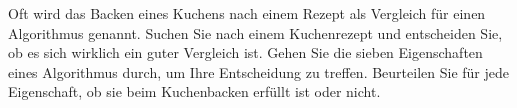 \begin{exercise}
Oft wird das Backen eines Kuchens nach einem Rezept als Vergleich für einen Algorithmus genannt. Suchen Sie nach einem Kuchenrezept und entscheiden Sie, ob es sich wirklich ein guter Vergleich ist. Gehen Sie die sieben Eigenschaften eines Algorithmus durch, um Ihre Entscheidung zu treffen. Beurteilen Sie für jede Eigenschaft, ob sie beim Kuchenbacken erfüllt ist oder nicht.

\end{exercise}